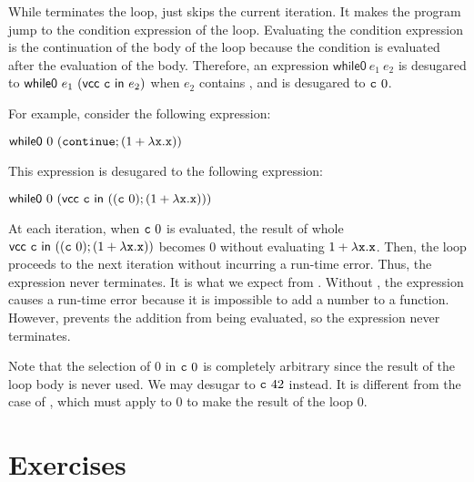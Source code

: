 While  terminates the loop,  just skips the current
iteration. It makes the program jump to the condition expression of the loop.
Evaluating the condition expression is the continuation of the body of the loop
because the condition is evaluated after the evaluation of the
body. Therefore, an expression $\textsf{while0}\ e_1\ e_2$ is desugared to
$\textsf{while0}\ e_1\ (\evcc{\code{c}}{e_2})$ when $e_2$ contains
, and  is desugared to $\code{c}\ 0$.

For example, consider the following expression:

$\textsf{while0}\ 0\ (\code{continue};(1+\efun{\cx}{\cx}))$

This expression is desugared to the following expression:

$\textsf{while0}\ 0\ (\evcc{\code{c}}{((\code{c}\ 0);(1+\efun{\cx}{\cx}))})$

At each iteration, when $\code{c}\ 0$ is evaluated,
the result of whole $\evcc{\code{c}}{((\code{c}\ 0);(1+\efun{\cx}{\cx}))}$ becomes
$0$ without evaluating $1+\lambda\texttt{x}.\texttt{x}$. Then, the loop proceeds to the
next iteration without incurring a run-time error. Thus, the expression never
terminates. It is what we expect from . Without ,
the expression causes a run-time error because it is impossible to add a number to
a function. However,  prevents the addition from being evaluated,
so the expression never terminates.

Note that the selection of $0$ in $\code{c}\ 0$ is completely arbitrary
since the result of the loop body is
never used. We may desugar  to $\texttt{c}\ 42$ instead. It is
different from the case of , which must apply  to $0$ to
make the result of the loop $0$.

\section{Exercises}

